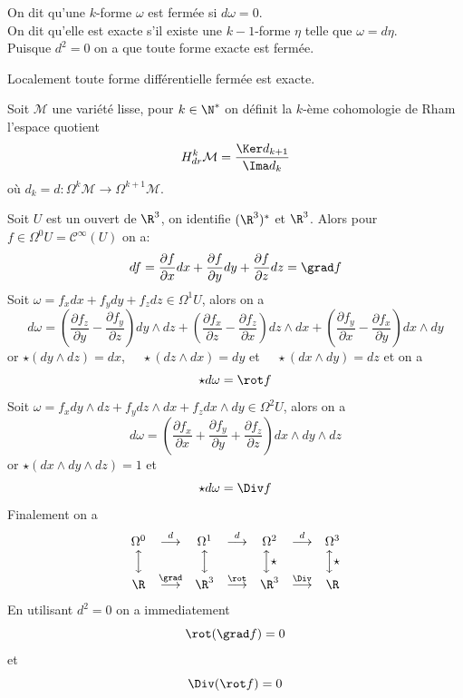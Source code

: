 \begin{defi}
On dit qu'une $k$-forme $\omega$ est fermée si $d\omega = 0$. \\
On dit qu'elle est exacte s'il existe une $k-1$-forme $\eta$ telle que $\omega = d\eta$. \\
Puisque $d^2 = 0$ on a que toute forme exacte est fermée.
\end{defi}

\begin{pro}
Localement toute forme différentielle fermée est exacte.
\end{pro}

\begin{defi}
Soit $\mathcal{M}$ une variété lisse, pour $k\in \N^*$ on définit la $k$-ème cohomologie de Rham l'espace quotient 
$$H_{dr}^k\mathcal{M} = \frac{\Ker d_{k+1}}{\Ima d_k}$$
où $d_k = d: \Omega^k\mathcal{M} \to \Omega^{k+1}\mathcal{M}$.
\end{defi}

\begin{exe}
Soit $U$ est un ouvert de $\R^3$, on identifie $(\R^3)^*$ et $\R^3$. Alors pour $f \in \Omega^0U = \mathscr{C}^\infty(U)$ on a:
$$df = \frac{\partial f}{\partial x} dx + \frac{\partial f}{\partial y} dy + \frac{\partial f}{\partial z} dz = \grad f$$
Soit $\omega = f_x dx + f_y dy + f_z dz \in \Omega^1U$, alors on a
$$d\omega = \left(\frac{\partial f_z}{\partial y} - \frac{\partial f_y}{\partial z}\right)dy\wedge dz + \left(\frac{\partial f_x}{\partial z} - \frac{\partial f_z}{\partial x}\right)dz\wedge dx + \left(\frac{\partial f_y}{\partial x} - \frac{\partial f_x}{\partial y}\right)dx\wedge dy$$
or $\star (dy\wedge dz) = dx$, $\quad\star (dz\wedge dx) = dy$ et $\quad\star (dx\wedge dy) = dz$ et on a 
$$\star d\omega = \rot f$$ 
Soit $\omega = f_x dy\wedge dz + f_y dz\wedge dx + f_z dx \wedge dy \in \Omega^2U$, alors on a 
$$d\omega = \left(\frac{\partial f_x}{\partial x} + \frac{\partial f_y}{\partial y} + \frac{\partial f_z}{\partial z}\right) dx\wedge dy\wedge dz$$
or $\star (dx\wedge dy\wedge dz) = 1$ et
$$\star d\omega = \Div f$$
Finalement on a 
$$\begin{matrix}
\Omega^0 & \overset{d}{\longrightarrow} & \Omega^1 & \overset{d}{\longrightarrow} & \Omega^2 & \overset{d}{\longrightarrow} & \Omega^3\\
\Big\updownarrow &  & \Big\updownarrow &  & \Big\updownarrow\star &  & \Big\updownarrow\star\\
\R & \overset{\grad}{\longrightarrow} & \R^3 & \overset{\rot}{\longrightarrow} & \R^3 & \overset{\Div}{\longrightarrow} & \R
\end{matrix}
$$
En utilisant $d^2 = 0$ on a immediatement 
$$\rot(\grad f) = 0 $$
et 
$$\Div(\rot f) = 0$$
\end{exe}

